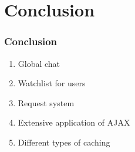 \section{Conclusion}
\begin{frame}
\frametitle{Conclusion}

	\begin{enumerate}[<+->]
	\setlength\itemsep{1em}
	\item Global chat
	\item Watchlist for users
	\item Request system
	\item Extensive application of AJAX
	\item Different types of caching
\end{enumerate}


\end{frame}
